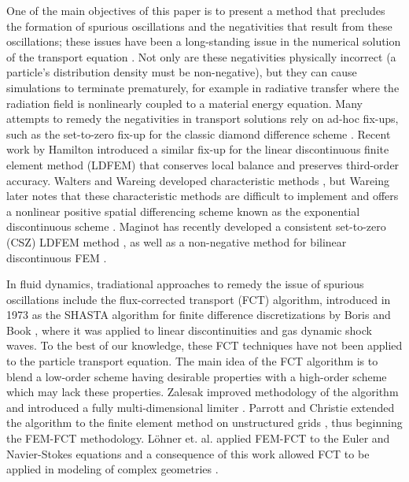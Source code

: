 One of the main objectives of this paper is to present a method that precludes
the formation of spurious oscillations and the negativities that result from
these oscillations; these issues have been a long-standing issue in the
numerical solution of the transport equation \cite{lathrop}.
Not only are these negativities physically incorrect 
(a particle's distribution density must be non-negative), but they can cause
simulations to terminate prematurely, for example in radiative transfer where
the radiation field is nonlinearly coupled to a material energy equation. 
Many attempts to remedy the negativities in 
transport solutions rely on ad-hoc fix-ups, such as the set-to-zero fix-up for the
classic diamond difference scheme \cite{lewis}. Recent work by Hamilton
introduced a similar fix-up for the linear discontinuous finite element
method (LDFEM) that conserves local balance and preserves third-order accuracy.
Walters and Wareing developed characteristic methods \cite{walters_NC}, but
Wareing later notes that these characteristic methods are difficult to
implement and offers a nonlinear positive spatial differencing scheme
known as the exponential discontinuous scheme \cite{wareing}.
Maginot has recently developed a consistent set-to-zero (CSZ) LDFEM
method \cite{maginot}, as well as a non-negative method for bilinear
discontinuous FEM \cite{maginot_mc2015}. 

In fluid dynamics, tradiational approaches to remedy the issue of spurious oscillations include
the flux-corrected transport (FCT) algorithm, introduced in 1973 as
the SHASTA algorithm for finite difference discretizations
by Boris and Book \cite{borisbook}, where it was applied to linear discontinuities
and gas dynamic shock waves. To the best of our knowledge, these FCT techniques have not been
applied to the particle transport equation.  
The main idea of the FCT algorithm is to blend a
low-order scheme having desirable properties with a high-order scheme which may
lack these properties.
Zalesak improved methodology of the algorithm and introduced a fully
multi-dimensional limiter \cite{zalesak}.
Parrott and Christie extended the algorithm to the finite element method
on unstructured grids \cite{parrott}, thus beginning the FEM-FCT methodology.
L\"{o}hner et. al. applied FEM-FCT to the Euler and Navier-Stokes equations and
a consequence of this work allowed FCT to be applied in modeling of complex
geometries \cite{lohner}. 

